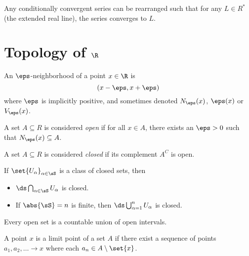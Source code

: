 \documentclass{article}
\begin{document}
\begin{theorem}\label{thm:riemann-rearrangement}
  Any conditionally convergent series can be rearranged such that for any $L \in R^{*}$ (the extended real line),
  the series converges to $L$.
\end{theorem}

\section{Topology of $\R$}

\begin{defn}\label{defn:epsilon-neighborhood}
  An $\eps$-neighborhood of a point $x \in \R$ is
  \[ (x - \eps, x + \eps) \]
  where $\eps$ is implicitly positive,
  and sometimes denoted $N_{\eps}(x)$, $\eps(x)$ or $V_{\eps}(x)$.
\end{defn}

\begin{defn}\label{defn:open-set}
  A set $A \subseteq R$ is considered \emph{open} if for all $x \in A$, there exists an $\eps > 0$ such that
  $N_{\eps}(x) \subseteq A$.
\end{defn}

\begin{defn}\label{defn:closed-set}
  A set $A \subseteq R$ is considered \emph{closed} if its complement $A^{C}$ is open.
\end{defn}

\begin{theorem}\label{thm:union-closed-sets}
  If $\set{U_{\alpha}}_{\alpha \in \sS}$ is a class of closed sets, then
  \begin{itemize}
    \item $\ds\bigcap_{\alpha \in \sS}U_{\alpha}$ is closed.
    \item If $\abs{\sS} = n$ is finite, then $\ds\bigcup_{\alpha = 1}^{n}U_{\alpha}$ is closed.
  \end{itemize}
\end{theorem}

\begin{prop}
  Every open set is a countable union of open intervals.
\end{prop}

\begin{defn}\label{defn:limit-point}
  A point $x$ is a limit point of a set $A$ if there exist a sequence of points $a_{1}, a_{2}, \ldots \to x$ where each $a_{n} \in A \setminus \set{x}$.
\end{defn}
\end{document}
